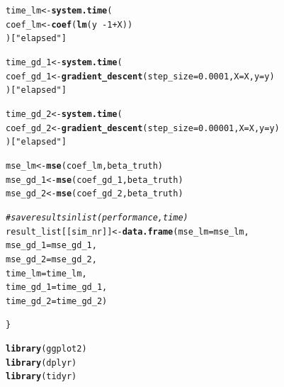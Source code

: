 \documentclass[a4paper]{article}
\makeatletter
\newcommand{\hlnum}[1]{\textcolor[rgb]{0.686,0.059,0.569}{#1}}%
\newcommand{\hlstr}[1]{\textcolor[rgb]{0.192,0.494,0.8}{#1}}%
\newcommand{\hlcom}[1]{\textcolor[rgb]{0.678,0.584,0.686}{\textit{#1}}}%
\newcommand{\hlopt}[1]{\textcolor[rgb]{0,0,0}{#1}}%
\newcommand{\hlstd}[1]{\textcolor[rgb]{0.345,0.345,0.345}{#1}}%
\newcommand{\hlkwb}[1]{\textcolor[rgb]{0.69,0.353,0.396}{#1}}%
\newcommand{\hlkwc}[1]{\textcolor[rgb]{0.333,0.667,0.333}{#1}}%
\newcommand{\hlkwd}[1]{\textcolor[rgb]{0.737,0.353,0.396}{\textbf{#1}}}%
\newenvironment{kframe}{%
 \def\at@end@of@kframe{}%
 \ifinner\ifhmode%
  \def\at@end@of@kframe{\end{minipage}}%
  \begin{minipage}{\columnwidth}%
 \fi\fi%
 \def\FrameCommand##1{\hskip\@totalleftmargin \hskip-\fboxsep
 \colorbox{shadecolor}{##1}\hskip-\fboxsep
     \hskip-\linewidth \hskip-\@totalleftmargin \hskip\columnwidth}%
 \MakeFramed {\advance\hsize-\width
   \@totalleftmargin\z@ \linewidth\hsize
   \@setminipage}}%
 {\par\unskip\endMakeFramed%
 \at@end@of@kframe}
\newenvironment{knitrout}{}{} %
\makeatother
\begin{document}
{\begin{enumerate}
\begin{knitrout}
\begin{kframe}
\begin{alltt}
  \hlstd{time_lm} \hlkwb{<-} \hlkwd{system.time}\hlstd{(}
    \hlstd{coef_lm} \hlkwb{<-} \hlkwd{coef}\hlstd{(}\hlkwd{lm}\hlstd{(y}\hlopt{~-}\hlnum{1}\hlopt{+}\hlstd{X))}
  \hlstd{)[}\hlstr{"elapsed"}\hlstd{]}

  \hlstd{time_gd_1} \hlkwb{<-} \hlkwd{system.time}\hlstd{(}
    \hlstd{coef_gd_1} \hlkwb{<-} \hlkwd{gradient_descent}\hlstd{(}\hlkwc{step_size} \hlstd{=} \hlnum{0.0001}\hlstd{,} \hlkwc{X} \hlstd{= X,} \hlkwc{y} \hlstd{= y)}
  \hlstd{)[}\hlstr{"elapsed"}\hlstd{]}

  \hlstd{time_gd_2} \hlkwb{<-} \hlkwd{system.time}\hlstd{(}
    \hlstd{coef_gd_2} \hlkwb{<-} \hlkwd{gradient_descent}\hlstd{(}\hlkwc{step_size} \hlstd{=} \hlnum{0.00001}\hlstd{,} \hlkwc{X} \hlstd{= X,} \hlkwc{y} \hlstd{= y)}
  \hlstd{)[}\hlstr{"elapsed"}\hlstd{]}


  \hlstd{mse_lm} \hlkwb{<-} \hlkwd{mse}\hlstd{(coef_lm, beta_truth)}
  \hlstd{mse_gd_1} \hlkwb{<-} \hlkwd{mse}\hlstd{(coef_gd_1, beta_truth)}
  \hlstd{mse_gd_2} \hlkwb{<-} \hlkwd{mse}\hlstd{(coef_gd_2, beta_truth)}

  \hlcom{# save results in list (performance, time)}
  \hlstd{result_list[[sim_nr]]} \hlkwb{<-} \hlkwd{data.frame}\hlstd{(}\hlkwc{mse_lm} \hlstd{= mse_lm,}
                                      \hlkwc{mse_gd_1} \hlstd{= mse_gd_1,}
                                      \hlkwc{mse_gd_2} \hlstd{= mse_gd_2,}
                                      \hlkwc{time_lm} \hlstd{= time_lm,}
                                      \hlkwc{time_gd_1} \hlstd{= time_gd_1,}
                                      \hlkwc{time_gd_2} \hlstd{= time_gd_2)}

\hlstd{\}}

\hlkwd{library}\hlstd{(ggplot2)}
\hlkwd{library}\hlstd{(dplyr)}
\hlkwd{library}\hlstd{(tidyr)}


\end{alltt}
\end{kframe}
\end{knitrout}
\end{enumerate}}
\end{document}
